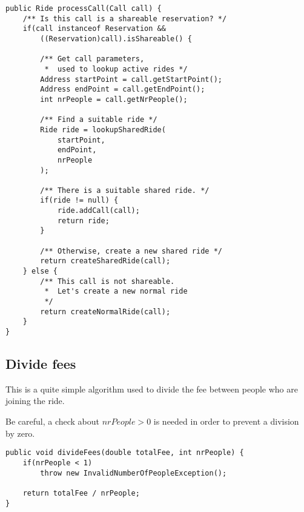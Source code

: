 \begin{lstlisting}[caption={processCall()}]
public Ride processCall(Call call) {
    /** Is this call is a shareable reservation? */
    if(call instanceof Reservation && 
        ((Reservation)call).isShareable() {

        /** Get call parameters, 
         *  used to lookup active rides */
        Address startPoint = call.getStartPoint();
        Address endPoint = call.getEndPoint();
        int nrPeople = call.getNrPeople();

        /** Find a suitable ride */
        Ride ride = lookupSharedRide(
            startPoint, 
            endPoint, 
            nrPeople
        );

        /** There is a suitable shared ride. */
        if(ride != null) {
            ride.addCall(call);
            return ride;
        }
        
        /** Otherwise, create a new shared ride */
        return createSharedRide(call);
    } else {
        /** This call is not shareable. 
         *  Let's create a new normal ride
         */
        return createNormalRide(call); 
    }
}
\end{lstlisting}
\pagebreak
\subsection{Divide fees}
This is a quite simple algorithm used to divide the fee between 
people who are joining the ride.

Be careful, a check about $ nrPeople > 0 $ is needed in order to prevent
a division by zero.

\begin{lstlisting}[caption={Divide fees between partecipants}]
public void divideFees(double totalFee, int nrPeople) {
    if(nrPeople < 1)
        throw new InvalidNumberOfPeopleException();

    return totalFee / nrPeople;
}
\end{lstlisting}
